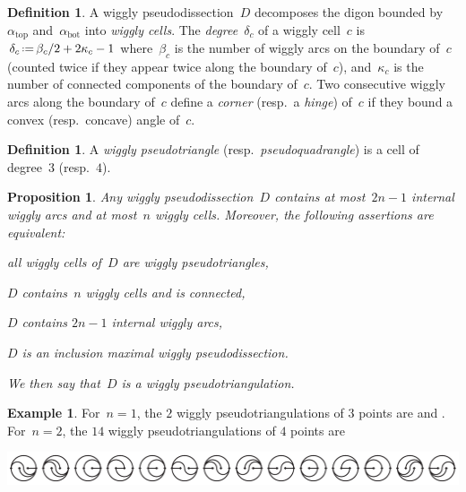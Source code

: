 \documentclass[submission]{FPSAC2025}
\newtheorem{proposition}[theorem]{Proposition}
\theoremstyle{definition}
\newtheorem{definition}[theorem]{Definition}
\newtheorem{example}[theorem]{Example}
\newcommand{\eqdef}{\mbox{\,\raisebox{0.2ex}{\scriptsize\ensuremath{\mathrm:}}\ensuremath{=}\,}} %
\newcommand{\darkblue}{\color{darkblue}} %
\newcommand{\defn}[1]{\textsl{\darkblue #1}} %
\begin{document}
\begin{definition}
A wiggly pseudodissection~$D$ decomposes the digon bounded by~$\alpha_\mathrm{top}$ and~$\alpha_\mathrm{bot}$ into \defn{wiggly cells}.
The \defn{degree}~$\delta_c$ of a wiggly cell~$c$ is~$\delta_c \eqdef \beta_c/2+2\kappa_c-1$ where~$\beta_c$ is the number of wiggly arcs on the boundary of~$c$ (counted twice if they appear twice along the boundary of~$c$), and~$\kappa_c$ is the number of connected components of the boundary of~$c$.
Two consecutive wiggly arcs along the boundary of~$c$ define a \defn{corner} (resp.~a \defn{hinge}) of~$c$ if they bound a convex (resp.~concave) angle of~$c$.
\end{definition}

\begin{definition}
A \defn{wiggly pseudotriangle} (resp.~\defn{pseudoquadrangle}) is a cell of degree~$3$ (resp.~$4$).
\end{definition}

\begin{proposition}
\label{prop:wigglyPseudotriangulations}
Any wiggly pseudodissection~$D$ contains at most~$2n-1$ internal wiggly arcs and at most~$n$ wiggly cells.
Moreover, the following assertions are equivalent:
\begin{compactenum}[(i)]
\item all wiggly cells of~$D$ are wiggly pseudotriangles,
\item $D$ contains~$n$ wiggly cells and is connected,
\item $D$ contains $2n-1$ internal wiggly arcs,
\item $D$ is an inclusion maximal wiggly pseudodissection.
\end{compactenum}
We then say that~$D$ is a \defn{wiggly pseudotriangulation}.
\end{proposition}

\begin{example}
\label{exm:allSmallWigglyPseudotriangulations}
For~$n = 1$, the $2$ wiggly pseudotriangulations of $3$ points are  and .
For~${n = 2}$, the $14$ wiggly pseudotriangulations of $4$ points are \\[.2cm]
\centerline{\includegraphics[scale=.85]{wigglyPseudotriangulations}}
\end{example}
\end{document}
